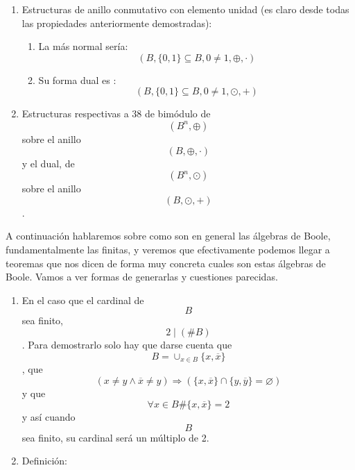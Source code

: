 \begin{enumerate}
\begin{enumerate}
\begin{enumerate}
\begin{enumerate}
        \[{= {{({\overline{y} + {({z \cdot \overline{z}})}})} \cdot {({y + {({z \cdot \overline{z}})}})}}} =\]

        \[{= {z \cdot \overline{z}}} = 0\]

        \[\text{De}{\lbrack\mathbf{A}\rbrack}\text{y de}{\lbrack\mathbf{B}\rbrack}\text{se obtiene que}{\overline{({x+{({y\odot z})}})} = \overline{({{({x+y})}\odot{({x+z})}})}}\]

        \[\text{Y de aquí, por la unicidad del complementario obtenemos}\]

        \[{{x + {({y \odot z})}} = {({x + y})}} \odot {({x + z})}\]
      \end{enumerate}
    \item
      Estructuras de anillo conmutativo con elemento unidad (es claro
      desde todas las pro\-piedades anteriormente demostradas):

      \begin{enumerate}
      \def\labelenumiv{\arabic{enumiv}.}
      \tightlist
      \item
        La más normal sería:
        \[({B,{{\{ 0,1\}} \subseteq B},{0 \neq 1}, \oplus , \cdot})\]
      \item
        Su forma dual es
        :\[({B,{{\{ 0,1\}} \subseteq B},{0 \neq 1}, \odot , +})\]
      \end{enumerate}
    \item
      Estructuras respectivas a 38 de bimódulo
      de\[({B^{n}, \oplus})\]sobre el anillo \[({B, \oplus , \cdot})\] y
      el dual, de \[({B^{n}, \odot})\]sobre el anillo
      \[({B, \odot , +})\].
    \end{enumerate}

    A continuación hablaremos sobre como son en general las álgebras de
    Boole, funda\-mentalmente las finitas, y veremos que efectivamente
    podemos llegar a teoremas que nos dicen de forma muy concreta cuales
    son estas álgebras de Boole. Vamos a ver for\-mas de generarlas y
    cuestiones parecidas.

    \begin{enumerate}
    \def\labelenumiii{\arabic{enumiii}.}
    \setcounter{enumiii}{39}
    \item
      En el caso que el cardinal de \[B\]sea finito,
      \[2 \mid {({\# B})}\]. Para demostrarlo solo hay que darse cuenta
      que \[{B = \cup_{x \in B}}{\{{x,\overline{x}}\}}\], que
      \[{({{x \neq {y \land \overline{x}}} \neq y})}\Rightarrow{({{{\{{x,\overline{x}}\}} \cap {\{{y,\overline{y}}\}}} = \varnothing})}\]
      y que \[\forall{x \in B}\#{{\{{x,\overline{x}}\}} = 2}\] y así
      cuando\[B\]sea finito, su cardinal será un múlti\-plo de 2.
    \item
      Definición:


\end{enumerate}
\end{enumerate}
\end{enumerate}
